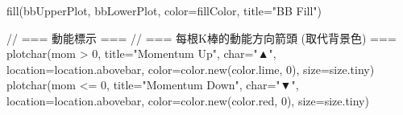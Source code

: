 fill(bbUpperPlot, bbLowerPlot, color=fillColor, title="BB Fill")

// === 動能標示 ===
// === 每根K棒的動能方向箭頭 (取代背景色) ===
plotchar(mom > 0, title="Momentum Up", char="▲", location=location.abovebar,
     color=color.new(color.lime, 0), size=size.tiny)
plotchar(mom <= 0, title="Momentum Down", char="▼", location=location.abovebar,
     color=color.new(color.red, 0), size=size.tiny)

